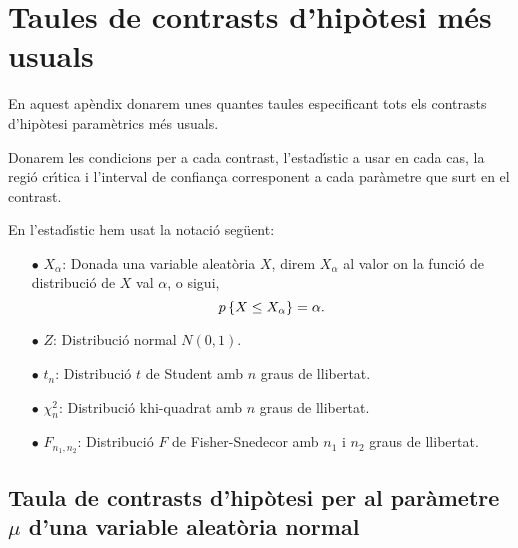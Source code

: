 \appendix

\chapter{Taules de contrasts d'hip\`otesi m\'es usuals}

En aquest ap\`endix
donarem unes quantes taules especificant tots els contrasts d'hip\`otesi
param\`etrics m\'es usuals. 

Donarem les condicions per a cada contrast, l'estad\'{\i}stic
a usar en cada cas, la regi\'o cr\'{\i}tica i 
l'interval de confian\c ca corresponent a
cada par\`ametre que surt en el contrast.

En l'estad\'{\i}stic hem usat la notaci\'o seg\"uent:
\begin{itemize}
\item[$\bullet$] $X_\alpha$: {Donada una variable aleat\`oria 
$X$, direm $X_\alpha$ al valor on la
funci\'o de distribuci\'o de $X$ val $\alpha$, o sigui, $$p\left\{X\leq X_\alpha
\right\}=\alpha.$$} 
\item[$\bullet$] $Z$: {Distribuci\'o normal $N(0,1)$.} 
\item[$\bullet$] $t_n$: {Distribuci\'o
$t$ de Student amb $n$ graus de llibertat.} 
\item[$\bullet$] $\chi_n^2$: {Distribuci\'o
khi-quadrat amb $n$ graus de llibertat.} 
\item[$\bullet$] $F_{n_1,n_2}$: {Distribuci\'o $F$ de
Fisher-Snedecor amb $n_1$ i $n_2$ graus de llibertat.}
\end{itemize}

\section{Taula de contrasts d'hip\`otesi per al par\`ametre $\mu$ d'una 
variable aleat\`oria normal}

